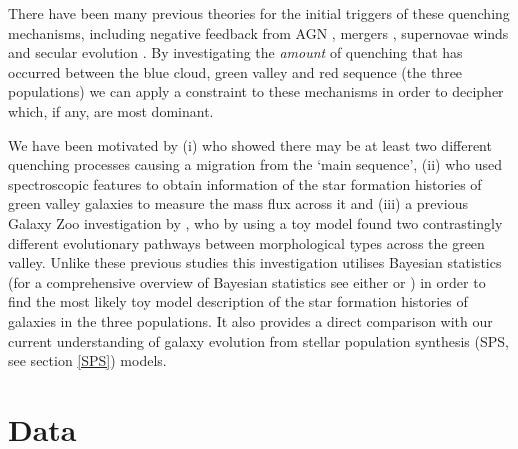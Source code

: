 \documentclass{mn2e}
\begin{document}
There have been many previous theories for the initial triggers of these quenching mechanisms, including negative feedback from AGN \citep{Sch07}, mergers \citep{Darg}, supernovae winds \citep{MFB12} and secular evolution \citep{Masters10, Masters11}. By investigating the \emph{amount} of quenching that has occurred between the blue cloud, green valley and red sequence (the three populations) we can apply a constraint to these mechanisms in order to decipher which, if any, are most dominant. 

We have been motivated by (i) \citet{Peng} who showed there may be at least two different quenching processes causing a migration from the `main sequence', (ii) \citet{Martin07} who used spectroscopic features to obtain information of the star formation histories of green valley galaxies to measure the mass flux across it and (iii) a previous Galaxy Zoo investigation by  \cite{Sch2014}, who by using a toy model found two contrastingly different evolutionary pathways between morphological types across the green valley. Unlike these previous studies this investigation utilises Bayesian statistics (for a comprehensive overview of Bayesian statistics see either \citealt{MacKay} or \citealt{Sivia}) in order to find the most likely toy model description of the star formation histories of galaxies in the three populations. It also provides a direct comparison with our current understanding of galaxy evolution from stellar population synthesis (SPS, see section \ref{SPS}) models. 

\section{Data}\label{data}
\end{document}
